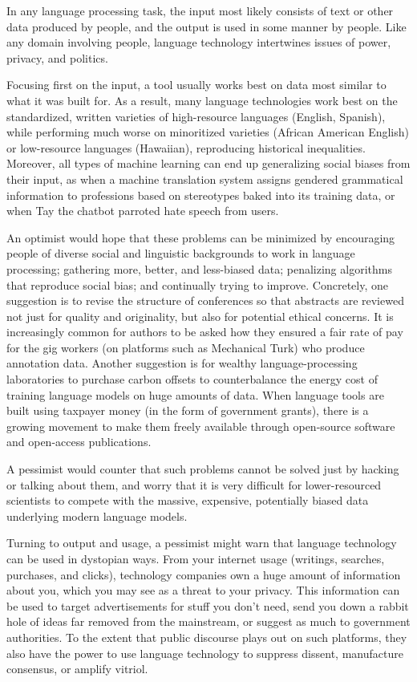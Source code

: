 In any language processing task, the input most likely consists of text or other data produced by people, and the output is used in some manner by people. Like any domain involving people, language technology intertwines issues of power, privacy, and politics. 

Focusing first on the input, a tool usually works best on data  most similar to what it was built for.  As a result, many language technologies work best on the standardized, written varieties of high-resource languages (English, Spanish), while performing much worse on minoritized varieties (African American English) or low-resource languages (Hawaiian), reproducing historical inequalities.  Moreover, all types of machine learning can end up generalizing social biases from their input, as when a machine translation system assigns gendered grammatical information to professions based on stereotypes baked into its training data, or when Tay the chatbot parroted hate speech from users.

An optimist would hope that these problems can be minimized by encouraging people of diverse social and linguistic backgrounds to work in language processing;  gathering more, better, and less-biased data;  penalizing algorithms that reproduce social bias; and  continually trying to improve.  Concretely, one suggestion is to revise the structure of conferences so that abstracts are reviewed not just for quality and originality, but also for potential ethical concerns. It is increasingly common for authors to be asked  how they ensured a fair rate of pay for the gig workers (on platforms such as Mechanical Turk) who produce annotation data. Another suggestion is for wealthy language-processing laboratories to purchase carbon offsets to counterbalance the energy cost of training  language models on huge amounts of data.  When language tools are built using taxpayer money (in the form of government grants), there is a growing movement to make them freely available through open-source software and open-access publications.

A pessimist would counter that such problems cannot be solved just by hacking or talking about them, and worry that it is very difficult for lower-resourced scientists to compete with the massive, expensive, potentially biased data underlying modern language models.


Turning to  output and usage, a pessimist might warn that language technology can be used in dystopian ways.  From your internet usage (writings, searches, purchases, and clicks), technology companies own a huge  amount of information about you, which you may see as a threat to your privacy.  This information can be used to target advertisements for stuff you don't need,  send you down a rabbit hole of ideas far removed from the mainstream, or suggest as much to government authorities.  To the extent that public discourse plays out on such platforms, they also have the power to use language technology to suppress dissent, manufacture consensus, or amplify vitriol.

